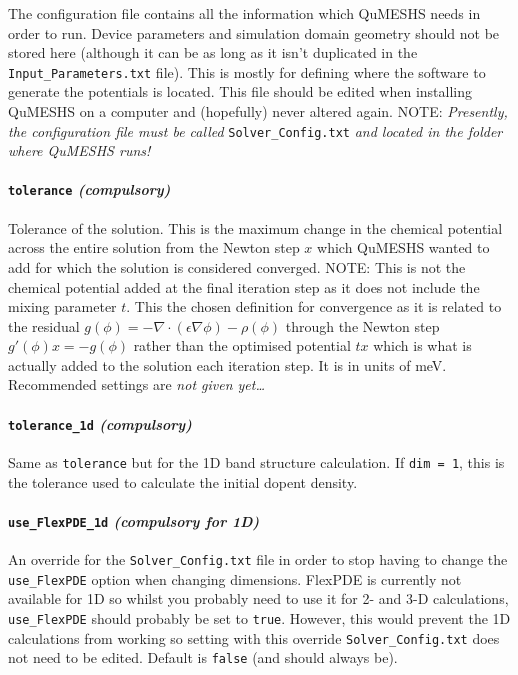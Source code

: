 \documentclass[12pt]{article}
\newcommand{\red}[1]{{\color{red} \it #1}}
\begin{document}
The configuration file contains all the information which QuMESHS needs in order
to run.  Device parameters and simulation domain geometry should not be stored here
(although it can be as long as it isn't duplicated in the \texttt{Input\_Parameters.txt}
file).  This is mostly for defining where the software to generate the potentials is
located.  This file should be edited when installing QuMESHS on a computer and
(hopefully) never altered again.  {\color{red} NOTE:} \emph{Presently, the
configuration file must be called} \texttt{Solver\_Config.txt} \emph{and located in
the folder where QuMESHS runs!}

\paragraph{\texttt{tolerance} \emph{(compulsory)}}
Tolerance of the solution.  This is the maximum change in the chemical potential
across the entire solution from the Newton step $x$ which QuMESHS wanted to add
for which the solution is considered converged.  {\color{red} NOTE:} This is not
the chemical potential added at the final iteration step as it does not include
the mixing parameter $t$.  This the chosen definition for convergence as it is
related to the residual $g(\phi) = - \nabla \cdot ( \epsilon \nabla \phi ) -
\rho (\phi)$ through the Newton step $g' (\phi) x = - g (\phi)$ rather than the
optimised potential $t x$ which is what is actually added to the solution each
iteration step.  It is in units of meV.  Recommended settings are \red{not given
yet\ldots}

\paragraph{\texttt{tolerance\_1d} \emph{(compulsory)}}
Same as \texttt{tolerance} but for the 1D band structure calculation.  If
\texttt{dim = 1}, this is the tolerance used to calculate the initial dopent
density.

\paragraph{\texttt{use\_FlexPDE\_1d} \emph{(compulsory for 1D)}}
An override for the \texttt{Solver\_Config.txt} file in order to stop having
to change the \texttt{use\_FlexPDE} option when changing dimensions.  FlexPDE
is currently not available for 1D so whilst you probably need to use it for
2- and 3-D calculations, \texttt{use\_FlexPDE} should probably be set to
\texttt{true}.  However, this would prevent the 1D calculations from working
so setting with this override \texttt{Solver\_Config.txt} does not need to be
edited.  Default is \texttt{false} (and should always be).
\end{document}
